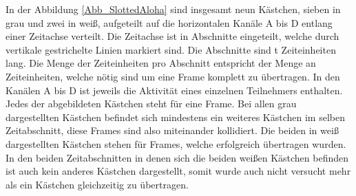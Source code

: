 In der Abbildung \ref{Abb_SlottedAloha} sind insgesamt neun Kästchen, sieben in grau und zwei in weiß, aufgeteilt auf die horizontalen Kanäle A bis D entlang einer Zeitachse verteilt. Die Zeitachse ist in Abschnitte eingeteilt, welche durch vertikale gestrichelte Linien markiert sind. Die Abschnitte sind t Zeiteinheiten lang. Die Menge der Zeiteinheiten pro Abschnitt entspricht der Menge an Zeiteinheiten, welche nötig sind um eine Frame komplett zu übertragen. In den Kanälen A bis D ist jeweils die Aktivität eines einzelnen Teilnehmers enthalten. Jedes der abgebildeten Kästchen steht für eine Frame. Bei allen grau dargestellten Kästchen befindet sich mindestens ein weiteres Kästchen im selben Zeitabschnitt, diese Frames sind also miteinander kollidiert. Die beiden in weiß dargestellten Kästchen stehen für Frames, welche erfolgreich übertragen wurden. In den beiden Zeitabschnitten in denen sich die beiden weißen Kästchen befinden ist auch kein anderes Kästchen dargestellt, somit wurde auch nicht versucht mehr als ein Kästchen gleichzeitig zu übertragen.

